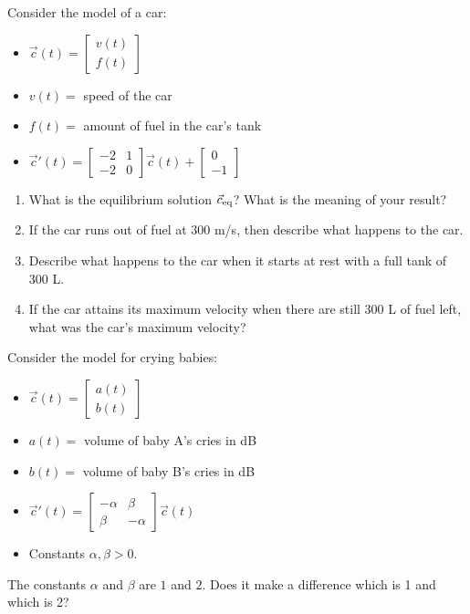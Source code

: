 \begin{exercises}
\begin{problist}
	
	\prob Consider the model of a car:
	\begin{itemize}
		\item $\vec{c}(t) = \begin{bmatrix} v(t) \\ f(t) \end{bmatrix}$
		\item $v(t)=$ speed of the car
		\item $f(t)=$ amount of fuel in the car's tank
		\item $\vec{c}'(t) =
		\begin{bmatrix}
			-2 & 1 \\
			-2 & 0 
		\end{bmatrix}
		\vec{c}(t)
		+ \begin{bmatrix}
 			0 \\ -1	
		\end{bmatrix}$
	\end{itemize}
	\begin{enumerate}
		\item What is the equilibrium solution $\vec{c}_{\rm eq}$? What is the meaning of your result?
		\item If the car runs out of fuel at 300 m/s, then describe what happens to the car. 
		\item Describe what happens to the car when it starts at rest with a full tank of $300$ L.
		\item If the car attains its maximum velocity when there are still $300$ L of fuel left, what was the car's maximum velocity?


	\end{enumerate}


	\prob Consider the model for crying babies:
	\begin{itemize}
		\item $\vec{c}(t) = \begin{bmatrix} a(t) \\ b(t) \end{bmatrix}$
		\item $a(t)=$ volume of baby A's cries in dB
		\item $b(t)=$ volume of baby B's cries in dB
		\item $\vec{c}'(t) =
		\begin{bmatrix}
			-\alpha & \beta \\
			\beta & -\alpha 
		\end{bmatrix}
		\vec{c}(t)$
		\item Constants $\alpha,\beta>0$.
	\end{itemize}

	The constants $\alpha$ and $\beta$ are $1$ and $2$. Does it make a difference which is 1 and which is 2?


	
		
	\end{problist}
\end{exercises}